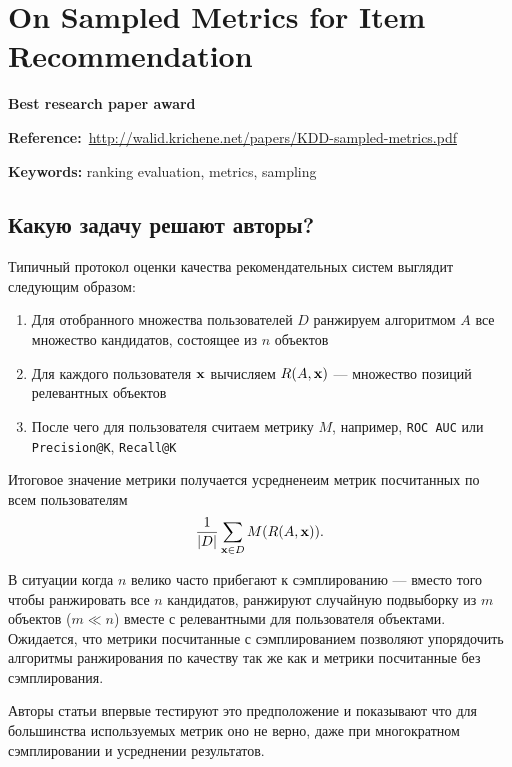 \chapter{On Sampled Metrics for Item Recommendation}

\textbf{Best research paper award}

\textbf{Reference:}~\url{http://walid.krichene.net/papers/KDD-sampled-metrics.pdf}

\textbf{Keywords:} ranking evaluation, metrics, sampling

\section{Какую задачу решают авторы?}

Типичный протокол оценки качества рекомендательных систем выглядит следующим образом:
\begin{enumerate}
    \item Для отобранного множества пользователей $D$ ранжируем алгоритмом $A$ все множество кандидатов, состоящее из $n$ объектов
    \item Для каждого пользователя ${\bf x}$ вычисляем $R(A, {\bf x})$ --- множество позиций релевантных объектов
    \item После чего для пользователя считаем метрику $M$, например, \texttt{ROC AUC} или \texttt{Precision@K}, \texttt{Recall@K}
\end{enumerate}

Итоговое значение метрики получается усредненеим метрик посчитанных по всем пользователям
\begin{equation*}
    \frac{1}{|D|}\sum\limits_{{\bf x} \in D} M(R(A, {\bf x})) .
\end{equation*}

В ситуации когда $n$ велико часто прибегают к сэмплированию --- вместо того чтобы ранжировать все $n$ кандидатов, ранжируют случайную подвыборку из $m$ объектов ($ m \ll n $) вместе с релевантными для пользователя объектами. \\

Ожидается, что метрики посчитанные с сэмплированием позволяют упорядочить алгоритмы ранжирования по качеству так же как и метрики посчитанные без сэмплирования. 

Авторы статьи впервые тестируют это предположение и показывают что для большинства используемых метрик оно не верно, даже при многократном сэмплировании и усреднении результатов. \\

